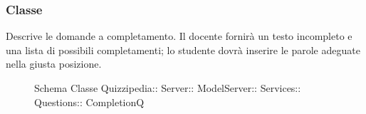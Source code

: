 \subsubsection{Classe }
Descrive le domande a completamento. Il docente fornirà un testo incompleto e una lista di possibili completamenti; lo studente dovrà inserire le parole adeguate nella giusta posizione.
\begin{figure}[H]
\centering
\noindent{}
\caption[Schema Classe CompletionQ]{Schema Classe Quizzipedia:: Server:: ModelServer:: Services:: Questions:: CompletionQ}
\end{figure}
